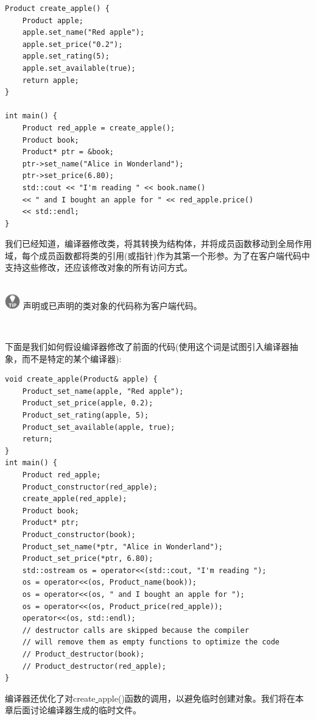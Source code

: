 \begin{lstlisting}[caption={}]
Product create_apple() {
	Product apple;
	apple.set_name("Red apple");
	apple.set_price("0.2");
	apple.set_rating(5);
	apple.set_available(true);
	return apple;
}

int main() {
	Product red_apple = create_apple();
	Product book;
	Product* ptr = &book;
	ptr->set_name("Alice in Wonderland");
	ptr->set_price(6.80);
	std::cout << "I'm reading " << book.name()
	<< " and I bought an apple for " << red_apple.price()
	<< std::endl;
}
\end{lstlisting}

我们已经知道，编译器修改类，将其转换为结构体，并将成员函数移动到全局作用域，每个成员函数都将类的引用(或指针)作为其第一个形参。为了在客户端代码中支持这些修改，还应该修改对象的所有访问方式。 \par

\hspace*{\fill} \\ %
\includegraphics[width=0.05\textwidth]{images/tip}
声明或已声明的类对象的代码称为客户端代码。\par
\noindent\textbf{}\ \par

下面是我们如何假设编译器修改了前面的代码(使用这个词是试图引入编译器抽象，而不是特定的某个编译器):\par

\begin{lstlisting}[caption={}]
void create_apple(Product& apple) {
	Product_set_name(apple, "Red apple");
	Product_set_price(apple, 0.2);
	Product_set_rating(apple, 5);
	Product_set_available(apple, true);
	return;
}
int main() {
	Product red_apple;
	Product_constructor(red_apple);
	create_apple(red_apple);
	Product book;
	Product* ptr;
	Product_constructor(book);
	Product_set_name(*ptr, "Alice in Wonderland");
	Product_set_price(*ptr, 6.80);
	std::ostream os = operator<<(std::cout, "I'm reading ");
	os = operator<<(os, Product_name(book));
	os = operator<<(os, " and I bought an apple for ");
	os = operator<<(os, Product_price(red_apple));
	operator<<(os, std::endl);
	// destructor calls are skipped because the compiler
	// will remove them as empty functions to optimize the code
	// Product_destructor(book);
	// Product_destructor(red_apple);
}
\end{lstlisting}

编译器还优化了对create\underline{ }apple()函数的调用，以避免临时创建对象。我们将在本章后面讨论编译器生成的临时文件。\par

